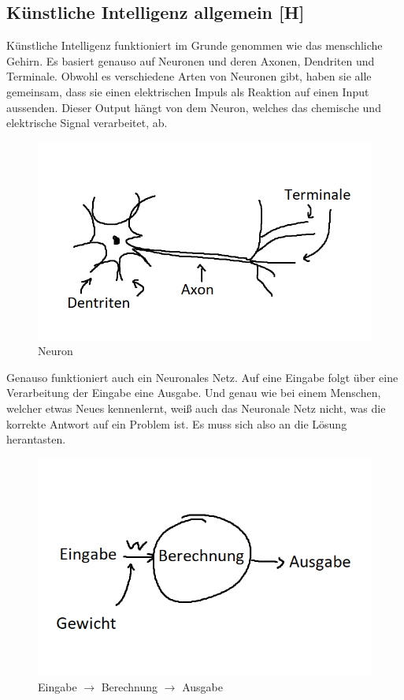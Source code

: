 \subsection{Künstliche Intelligenz allgemein [H]}\label{tech:ki:head}
Künstliche Intelligenz funktioniert im Grunde genommen wie das menschliche Gehirn. Es basiert genauso auf Neuronen und deren Axonen, Dendriten und Terminale. Obwohl es verschiedene Arten von Neuronen gibt, haben sie alle gemeinsam, dass sie einen elektrischen Impuls als Reaktion auf einen Input aussenden. Dieser Output hängt von dem Neuron, welches das chemische und elektrische Signal verarbeitet, ab.

\begin{figure}[H]
    \centering
    \includegraphics[scale=1]{pics/Neuron.png}
    \caption{Neuron}
    \label{fig:tech:Neuron}
\end{figure}

Genauso funktioniert auch ein Neuronales Netz. Auf eine Eingabe folgt über eine Verarbeitung der Eingabe eine Ausgabe. Und genau wie bei einem Menschen, welcher etwas Neues kennenlernt, weiß auch das Neuronale Netz nicht, was die korrekte Antwort auf ein Problem ist. Es muss sich also an die Lösung herantasten.

\begin{figure}[H]
    \centering
    \includegraphics[scale=1]{pics/eba.png}
    \caption{Eingabe $\rightarrow$ Berechnung $\rightarrow$ Ausgabe}
    \label{fig:tech:eba}
\end{figure}

